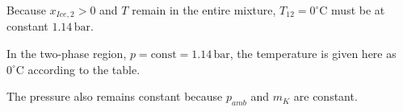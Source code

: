 Because \( x_{Ice,2} > 0 \) and \( T \) remain in the entire mixture, \( T_{12} = 0^\circ \text{C} \) must be at constant \( 1.14 \, \text{bar} \).  

In the two-phase region, \( p = \text{const} = 1.14 \, \text{bar} \), the temperature is given here as \( 0^\circ \text{C} \) according to the table.  

The pressure also remains constant because \( p_{amb} \) and \( m_K \) are constant.